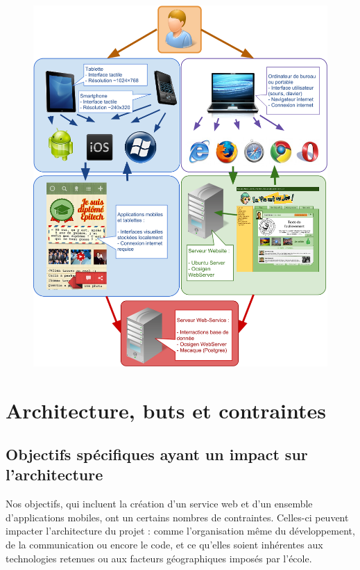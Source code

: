 \documentclass{life-fr}
\begin{document}
\begin{figure}[H]
  \begin{center}
    \includegraphics[width=17cm]{img/intro.png}
  \end{center}
\end{figure} 


\chapter{Architecture, buts et contraintes}
\section{Objectifs spécifiques ayant un impact sur l’architecture}

Nos objectifs, qui incluent la création d'un service web et d'un ensemble d'applications mobiles, ont un certains nombres de contraintes. Celles-ci peuvent impacter l'architecture du projet : comme l'organisation même du développement, de la communication ou encore le code, et ce qu'elles soient inhérentes aux technologies retenues ou aux facteurs géographiques imposés par l'école.
\end{document}
